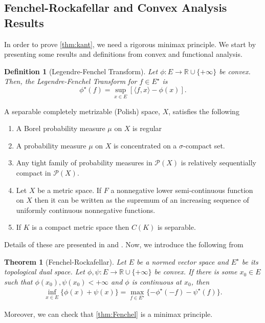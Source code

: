 \documentclass[12pt]{article}
\newcommand{\R}{\mathbb{R}}
\theoremstyle{plain}
\newtheorem{thm}{Theorem}[section]
\newtheorem{defn}{Definition}[section]
\numberwithin{equation}{section}
\begin{document}
\subsection{Fenchel-Rockafellar and Convex Analysis Results}
In order to prove \autoref{thm:kant}, we need a rigorous minimax principle. We start by presenting some results and definitions from convex and functional analysis.
\begin{defn}[Legendre-Fenchel Transform]
  Let $\phi: E \to \R\cup \{+\infty\}$ be convex. Then, the Legendre-Fenchel Transform for $f\in E^\star$ is
  \begin{equation}
    \phi^\star(f) = \sup_{x\in E}\left[\langle f, x\rangle - \phi(x)\right].
  \end{equation}  
\end{defn}
A separable completely metrizable (Polish) space, $X$, satisfies the following 
\begin{enumerate}
  \item A Borel probability measure $\mu$ on $X$ is regular
  \item A probability measure $\mu$ on $X$ is concentrated on a $\sigma$-compact set.
  \item Any tight family of probability measures in $\mathcal{P}(X)$ is relatively sequentially compact in $\mathcal{P}(X)$.
  \item Let $X$ be a metric space. If $F$ a nonnegative lower semi-continuous function on $X$ then it can be written as the supremum of an increasing sequence of uniformly continuous nonnegative functions.
  \item If $K$ is a compact metric space then $C(K)$ is separable.
\end{enumerate}
Details of these are presented in \cite{villani} and \cite{billingsey}.
Now, we introduce the following from \cite{brezis}
\begin{thm}[Fenchel-Rockafellar]\label{thm:Fenchel}
  Let $E$ be a normed vector space and $E^\star$ be its topological dual space. Let $\phi,\psi:E\to\R\cup\{+\infty\}$ be convex. If there is some $x_0\in E$ such that $\phi(x_0),\psi(x_0) <+\infty$ and $\phi$ is continuous at $x_0$, then
  \begin{align*}
    \inf_{x\in E}\{\phi(x)+\psi(x)\} = \max_{f\in E^\star}\{-\phi^\star(-f)-\psi^\star(f)\}.
  \end{align*}
\end{thm}
Moreover, we can check that \autoref{thm:Fenchel} is a minimax principle.
\end{document}
